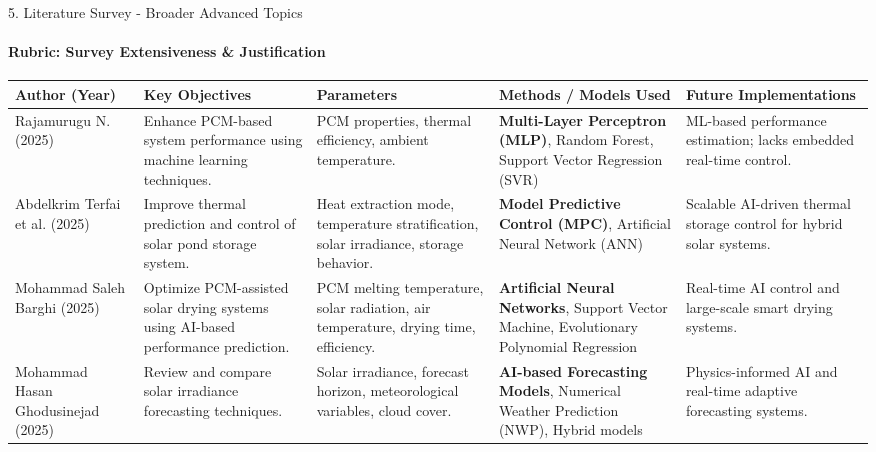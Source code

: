
\begin{frame}{5. Literature Survey - Broader Advanced Topics}
\framesubtitle{Rubric: Survey Extensiveness \& Justification}
\tiny
\renewcommand{\arraystretch}{1.5}
\begin{table}
\centering
\begin{tabular}{|p{1.6cm}|p{3.0cm}|p{2.8cm}|p{3.0cm}|p{3.0cm}|}
\hline
\textbf{Author (Year)} &
\textbf{Key Objectives} &
\textbf{Parameters} &
\textbf{Methods / Models Used} &
\textbf{Future Implementations} \\
\hline
Rajamurugu N. (2025) \cite{Rajamurugu2025PCMML} &
Enhance PCM-based system performance using machine learning techniques. &
PCM properties, thermal efficiency, ambient temperature. &
\textbf{Multi-Layer Perceptron (MLP)}, Random Forest, Support Vector Regression (SVR) &
ML-based performance estimation; lacks embedded real-time control. \\
\hline 

Abdelkrim Terfai et al. (2025) \cite{Terfai2025SolarPond_ANN_MPC} &
Improve thermal prediction and control of solar pond storage system. &
Heat extraction mode, temperature stratification, solar irradiance, storage behavior. &
\textbf{Model Predictive Control (MPC)}, Artificial Neural Network (ANN) &
Scalable AI-driven thermal storage control for hybrid solar systems. \\
\hline

Mohammad Saleh Barghi (2025) \cite{Barghi2026SolarDryingPCM} &
Optimize PCM-assisted solar drying systems using AI-based performance prediction. &
PCM melting temperature, solar radiation, air temperature, drying time, efficiency. &
\textbf{Artificial Neural Networks}, Support Vector Machine, Evolutionary Polynomial Regression &
Real-time AI control and large-scale smart drying systems. \\
\hline

Mohammad Hasan Ghodusinejad (2025) \cite{Ghodusinejad2026SolarForecast} &
Review and compare solar irradiance forecasting techniques. &
Solar irradiance, forecast horizon, meteorological variables, cloud cover. &
\textbf{AI-based Forecasting Models}, Numerical Weather Prediction (NWP), Hybrid models &
Physics-informed AI and real-time adaptive forecasting systems. \\
\hline 

\end{tabular}
\end{table}
\end{frame}



